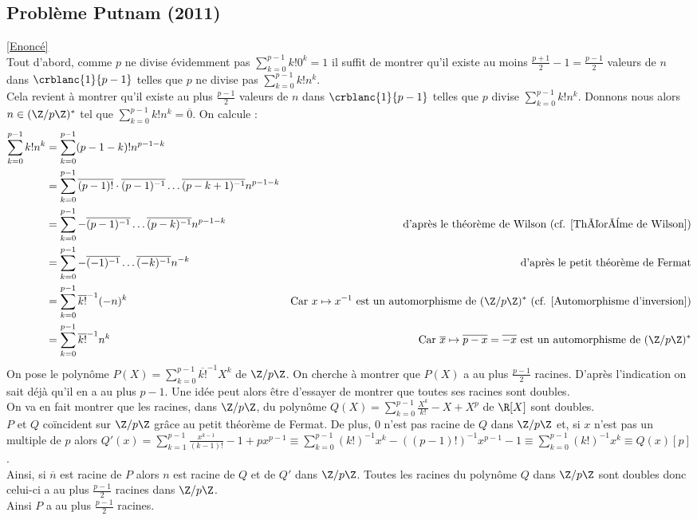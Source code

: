 \documentclass[8pt]{book}
\begin{document}
	\subsection{Problème Putnam (2011) }
	\label{Problème Putnam corrigé}
	\textcolor{blue}{\hyperref[Problème Putnam]{[Enoncé]}}\\
	Tout d'abord, comme $p$ ne divise évidemment pas $\displaystyle\sum_{k=0}^{p-1}k!0^k=1$ il suffit de montrer qu'il existe au moins $\displaystyle\frac{p+1}{2}-1=\frac{p-1}{2}$ valeurs de $n$ dans $\crblanc{1}{p-1}$ telles que $p$ ne divise pas $\displaystyle\sum_{k=0}^{p-1}k!n^k$.\\
	Cela revient à montrer qu'il existe au plus $\displaystyle\frac{p-1}{2}$ valeurs de $n$ dans $\crblanc{1}{p-1}$ telles que $p$ divise $\displaystyle\sum_{k=0}^{p-1}k!n^k$. Donnons nous alors $n\in (\Z/p\Z)^*$ tel que $\displaystyle\sum_{k=0}^{p-1}k!n^k=\overline 0$. On calcule :\\
	\begin{align*}
		\sum_{k=0}^{p-1}k!n^k&=\sum_{k=0}^{p-1}(p-1-k)!n^{p-1-k}\\
		&=\sum_{k=0}^{p-1}\overline{(p-1)!}\cdot\overline{(p-1)^{-1}}\dots\overline{(p-k+1)^{-1}}n^{p-1-k}\\
		&=\sum_{k=0}^{p-1}-\overline{(p-1)^{-1}}\dots\overline{(p-k)^{-1}}n^{p-1-k} &\text{d'après le théorème de Wilson (cf. \ref{Théorème de Wilson})}\\
		&=\sum_{k=0}^{p-1}-\overline{(-1)^{-1}}\dots\overline{(-k)^{-1}}n^{-k} &\text{d'après le petit théorème de Fermat}\\
		&=\sum_{k=0}^{p-1}\overline{k!}^{-1}(-n)^k &\text{Car }x\mapsto x^{-1}\text{ est un automorphisme de }(\Z/p\Z)^*\text{ (cf. \ref{Automorphisme d'inversion})}\\
		&=\sum_{k=0}^{p-1}\overline{k!}^{-1}n^k &\text{Car }\overline x\mapsto \overline{p-x}=\overline{-x}\text{ est un automorphisme de }(\Z/p\Z)^*\\
	\end{align*}
	On pose le polynôme $P(X)=\displaystyle\sum_{k=0}^{p-1}\overline{k!}^{-1}X^k$ de $\Z/p\Z$. On cherche à montrer que $P(X)$ a au plus $\displaystyle\frac{p-1}{2}$ racines. D'après l'indication on sait déjà qu'il en a au plus $p-1$. Une idée peut alors être d'essayer de montrer que toutes ses racines sont doubles.\\
	On va en fait montrer que les racines, dans $\Z/p\Z$, du polynôme $Q(X)=\displaystyle\sum_{k=0}^{p-1}\frac{X^k}{k!}-X+X^p$ de $\R[X]$ sont doubles.\\
	$P$ et $Q$ coïncident sur $\Z/p\Z$ grâce au petit théorème de Fermat. De plus, $0$ n'est pas racine de $Q$ dans $\Z/p\Z$ et, si $x$ n'est pas un multiple de $p$ alors $Q'(x)=\displaystyle\sum_{k=1}^{p-1}\frac{x^{k-1}}{(k-1)!}-1+px^{p-1}\equiv \sum_{k=0}^{p-1}(k!)^{-1}x^k-((p-1)!)^{-1}x^{p-1}-1\equiv \sum_{k=0}^{p-1}(k!)^{-1}x^k\equiv Q(x)[p]$.\\
	Ainsi, si $\overline n$ est racine de $P$ alors $n$ est racine de $Q$ et de $Q'$ dans $\Z/p\Z$. Toutes les racines du polynôme $Q$ dans $\Z/p\Z$ sont doubles donc celui-ci a au plus $\displaystyle\frac{p-1}{2}$ racines dans $\Z/p\Z$.\\
	Ainsi $P$ a au plus $\displaystyle\frac{p-1}{2}$ racines.
	
\end{document}
